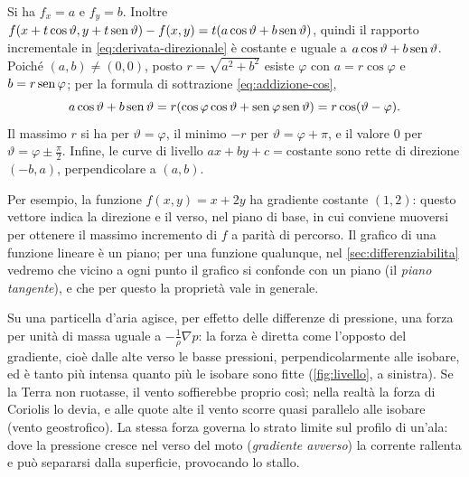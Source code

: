 \begin{dimostrazione}
Si ha $f_{x}=a$ e $f_{y}=b$. Inoltre
$f(x+t\cos\vartheta,y+t\operatorname{sen}\vartheta)-f(x,y)=t(a\cos\vartheta+b\operatorname{sen}\vartheta)$, quindi il rapporto
incrementale in \eqref{eq:derivata-direzionale} è costante e uguale a
$a\cos\vartheta+b\operatorname{sen}\vartheta$. Poiché $(a,b)\neq(0,0)$, posto $r=\sqrt{a^{2}+b^{2}}$ esiste
$\varphi$ con $a=r\cos\varphi$ e $b=r\operatorname{sen}\varphi$; per la formula di sottrazione
\eqref{eq:addizione-cos},
\[
  a\cos\vartheta+b\operatorname{sen}\vartheta=r(\cos\varphi\cos\vartheta+\operatorname{sen}\varphi\operatorname{sen}\vartheta)=r\cos(\vartheta-\varphi).
\]
Il massimo $r$ si ha per $\vartheta=\varphi$, il minimo $-r$ per $\vartheta=\varphi+\pi$, e il
valore $0$ per $\vartheta=\varphi\pm\frac\pi2$. Infine, le curve di livello
$ax+by+c=\text{costante}$ sono rette di direzione $(-b,a)$, perpendicolare a $(a,b)$.
\end{dimostrazione}

Per esempio, la funzione $f(x,y)=x+2y$ ha gradiente costante $(1,2)$: questo vettore
indica la direzione e il verso, nel piano di base, in cui conviene muoversi per ottenere
il massimo incremento di $f$ a parità di percorso. Il grafico di una funzione lineare è
un piano; per una funzione qualunque, nel \cref{sec:differenziabilita} vedremo che
vicino a ogni punto il grafico si confonde con un piano (il \emph{piano tangente}), e
che per questo la proprietà vale in generale.

\begin{idea}
Su una particella d'aria agisce, per effetto delle differenze di pressione, una forza
per unità di massa uguale a $-\frac1\rho\nabla p$: la forza è diretta come l'opposto del
gradiente, cioè dalle alte verso le basse pressioni, perpendicolarmente alle isobare, ed è
tanto più intensa quanto più le isobare sono fitte (\cref{fig:livello}, a sinistra). Se la
Terra non ruotasse, il vento soffierebbe proprio così; nella realtà la forza di Coriolis
lo devia, e alle quote alte il vento scorre quasi parallelo alle isobare (vento
geostrofico). La stessa forza governa lo strato limite sul profilo di un'ala: dove la
pressione cresce nel verso del moto (\emph{gradiente avverso}) la corrente rallenta e può
separarsi dalla superficie, provocando lo stallo.
\end{idea}

